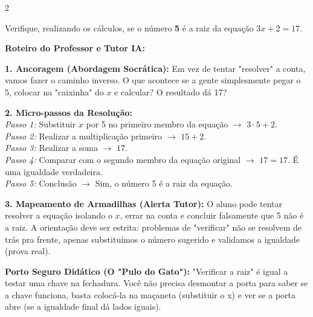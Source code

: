 \begin{multicols*}{2}
\begin{enunciadoLiteral}
Verifique, realizando os cálculos, se o número \textbf{5} é a raiz da equação $ 3x + 2 = 17 $.
\end{enunciadoLiteral}

\ifgabarito
    \begin{tcolorbox}[colback=CorTitUm!5, colframe=CorTitUm, boxrule=1pt, arc=4pt, left=6pt, right=6pt, top=6pt, bottom=6pt]
    \small\textbf{\textcolor{CorTitUm}{Roteiro do Professor e Tutor IA:}}\par\vspace{0.1cm}
    \color{CinzaEscuro}
    \textbf{1. Ancoragem (Abordagem Socrática):} Em vez de tentar "resolver" a conta, vamos fazer o caminho inverso. O que acontece se a gente simplesmente pegar o 5, colocar na "caixinha" do $x$ e calcular? O resultado dá 17?\par\vspace{0.1cm}
    
    \textbf{2. Micro-passos da Resolução:}\\
    \textit{Passo 1:} Substituir $x$ por 5 no primeiro membro da equação $\rightarrow$ $ 3 \cdot 5 + 2 $.\\
    \textit{Passo 2:} Realizar a multiplicação primeiro $\rightarrow$ $ 15 + 2 $.\\
    \textit{Passo 3:} Realizar a soma $\rightarrow$ $ 17 $.\\
    \textit{Passo 4:} Comparar com o segundo membro da equação original $\rightarrow$ $ 17 = 17 $. É uma igualdade verdadeira.\\
    \textit{Passo 5:} Conclusão $\rightarrow$ Sim, o número 5 é a raiz da equação.\par\vspace{0.1cm}
    
    \textbf{3. Mapeamento de Armadilhas (Alerta Tutor):} O aluno pode tentar resolver a equação isolando o $x$, errar na conta e concluir falsamente que 5 não é a raiz. A orientação deve ser estrita: problemas de "verificar" não se resolvem de trás pra frente, apenas substituímos o número sugerido e validamos a igualdade (prova real).
    \end{tcolorbox}
    \vspace{0.15cm}
    
    \begin{boxexplicacao}
    \textbf{Porto Seguro Didático (O "Pulo do Gato"):} "Verificar a raiz" é igual a testar uma chave na fechadura. Você não precisa desmontar a porta para saber se a chave funciona, basta colocá-la na maçaneta (substituir o x) e ver se a porta abre (se a igualdade final dá lados iguais).
    \end{boxexplicacao}
\fi


\end{multicols*}
